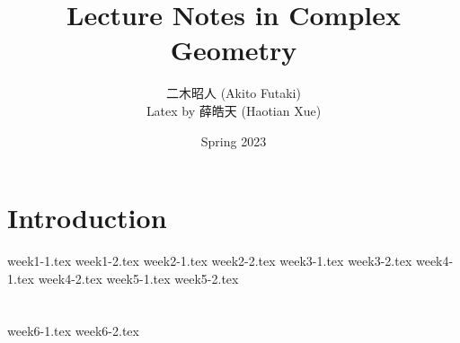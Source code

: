 \documentclass[twoside,12pt]{book}
\title{\Huge Lecture Notes in Complex Geometry}
\author{{\Large 二木昭人} (Akito Futaki)\\
Latex by 薛皓天 (Haotian Xue)}
\date{\Large Spring 2023}
\begin{document}
\maketitle
\frontmatter
\tableofcontents
\newpage
\mainmatter{}

\chapter{Introduction}
{week1-1.tex}
{week1-2.tex}
{week2-1.tex}
{week2-2.tex}
{week3-1.tex}
{week3-2.tex}
{week4-1.tex}
{week4-2.tex}
{week5-1.tex}
{week5-2.tex}
\chapter{}
{week6-1.tex}
{week6-2.tex}
\end{document}
